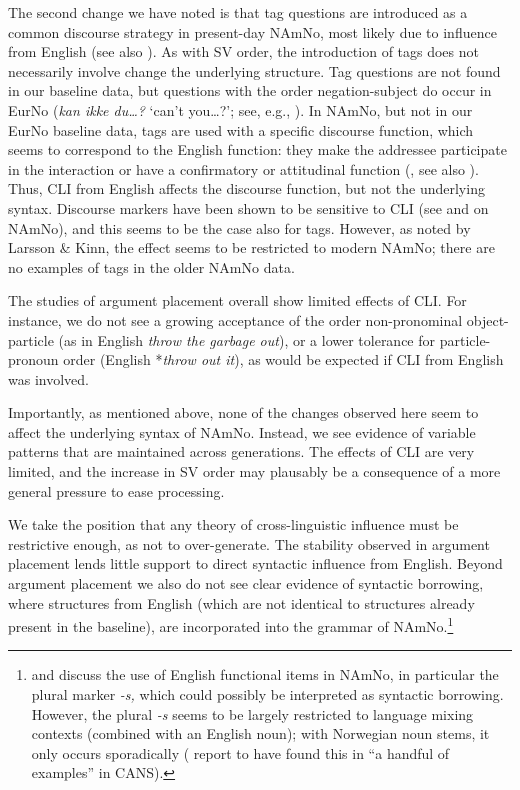 \documentclass[output=paper]{langscibook}
\begin{document}
The second change we have noted is that tag questions are introduced as a common discourse strategy in present-day NAmNo, most likely due to influence from English (see also \citealt{AnderssenWestergaard2020}). As with SV order, the introduction of tags does not necessarily involve change the underlying structure. Tag questions are not found in our baseline data, but questions with the order negation-subject do occur in EurNo (\textit{kan ikke du…?} ‘can’t you…?’; see, e.g., \citealt{UrbanikSvennevig2019}). In NAmNo, but not in our EurNo baseline data, tags are used with a specific discourse function, which seems to correspond to the English function: they make the addressee participate in the interaction or have a confirmatory or attitudinal function (\citealt{TottieHoffmann2006}, see also \citealt{LarssonForthcoming}). Thus, CLI from English affects the discourse function, but not the underlying syntax. Discourse markers have been shown to be sensitive to CLI (see \citealt{MoquinSalmons2020} and \citealt{SøftelandHjelde2021} on NAmNo), and this seems to be the case also for tags. However, as noted by Larsson \& Kinn, the effect seems to be restricted to modern NAmNo; there are no examples of tags in the older NAmNo data. 

The studies of argument placement overall show limited effects of CLI. For instance, we do not see a growing acceptance of the order non-pronominal object-particle (as in English \textit{throw the garbage out}), or a lower tolerance for particle-pronoun order (English *\textit{throw out it}), as would be expected if CLI from English was involved. 

Importantly, as mentioned above, none of the changes observed here seem to affect the underlying syntax of NAmNo. Instead, we see evidence of variable patterns that are maintained across generations. The effects of CLI are very limited, and the increase in SV order may plausably be a consequence of a more general pressure to ease processing.

We take the position that any theory of cross\hyp linguistic influence must be restrictive enough, as not to over-generate. The stability observed in argument placement lends little support to direct syntactic influence from English. Beyond argument placement we also do not see clear evidence of syntactic borrowing, where structures from English (which are not identical to structures already present in the baseline), are incorporated into the grammar of NAmNo.\footnote{\citet{Riksem2017} and  discuss the use of English functional items in NAmNo, in particular the plural marker \textit{{}-s,} which could possibly be interpreted as syntactic borrowing. However, the plural \textit{{}-s} seems to be largely restricted to language mixing contexts (combined with an English noun); with Norwegian noun stems, it only occurs sporadically ( report to have found this in ``a handful of examples” in CANS).} 
\end{document}
